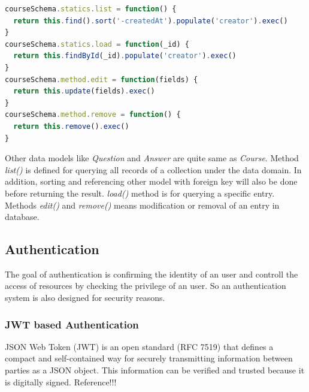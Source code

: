 \begin{lstlisting}[language=JavaScript, caption=Example: user schema definition within Mongoose, label={list:course-data-method-imp}]
courseSchema.statics.list = function() {
  return this.find().sort('-createdAt').populate('creator').exec()
}
courseSchema.statics.load = function(_id) {
  return this.findById(_id).populate('creator').exec()
}
courseSchema.method.edit = function(fields) {
  return this.update(fields).exec()
}
courseSchema.method.remove = function() {
  return this.remove().exec()
}
\end{lstlisting}

Other data models like \textit{Question} and \textit{Answer} are quite same as \textit{Course}. Method \textit{list()} is defined for querying all records of a collection under the data domain. In addition, sorting and referencing other model with foreign key will also be done before returning the result. \textit{load()} method is for querying a specific entry. Methods \textit{edit()} and \textit{remove()} means modification or removal of an entry in database.



\subsection{Authentication}
The goal of authentication is confirming the identity of an user and controll the access of resources by checking the privilege of an user. So an authentication system is also designed for security reasons.

\subsubsection{JWT based Authentication}
JSON Web Token (JWT) is an open standard (RFC 7519) that defines a compact and self-contained way for securely transmitting information between parties as a JSON object. This information can be verified and trusted because it is digitally signed. Reference!!!


